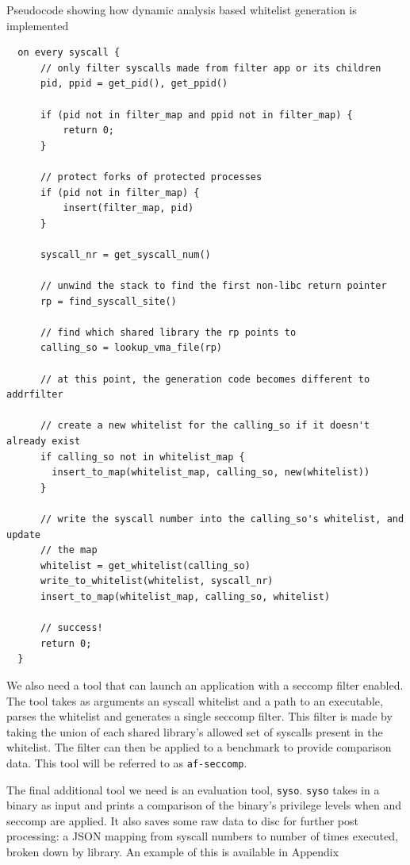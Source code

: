 \begin{listing}[ht]
  \caption{Pseudocode showing how dynamic analysis based whitelist generation is
  implemented}\label{lst:generator-pseudocode}
  \begin{verbatim}
  on every syscall {
      // only filter syscalls made from filter app or its children
      pid, ppid = get_pid(), get_ppid()

      if (pid not in filter_map and ppid not in filter_map) {
          return 0;
      }

      // protect forks of protected processes
      if (pid not in filter_map) {
          insert(filter_map, pid)
      }

      syscall_nr = get_syscall_num()

      // unwind the stack to find the first non-libc return pointer
      rp = find_syscall_site()

      // find which shared library the rp points to
      calling_so = lookup_vma_file(rp)

      // at this point, the generation code becomes different to addrfilter

      // create a new whitelist for the calling_so if it doesn't already exist
      if calling_so not in whitelist_map {
        insert_to_map(whitelist_map, calling_so, new(whitelist))
      }

      // write the syscall number into the calling_so's whitelist, and update
      // the map
      whitelist = get_whitelist(calling_so)
      write_to_whitelist(whitelist, syscall_nr)
      insert_to_map(whitelist_map, calling_so, whitelist)
        
      // success!
      return 0;
  }
  \end{verbatim}
\end{listing}

We also need a tool that can launch an application with a seccomp filter enabled.
The tool takes as arguments an \af syscall whitelist
and a path to an executable, parses the whitelist and generates a single
seccomp filter. This filter is made by taking the union of each shared 
library's allowed set of syscalls present in the \af whitelist. The filter can
then be applied to a benchmark to provide comparison data. This tool will be
referred to as \texttt{af-seccomp}.

The final additional tool we need is an evaluation tool, \texttt{syso}.
\texttt{syso} takes in a binary as input and prints a comparison of the 
binary's privilege levels  when \af and
seccomp are applied. It also saves some raw data to disc for further post
processing: a JSON mapping from syscall numbers to number of times executed,
broken down by library. An example of this is available in Appendix

